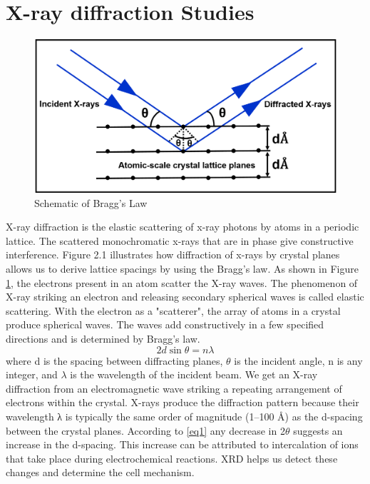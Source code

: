 \section{X-ray diffraction Studies}
\begin{figure}[tbh!]
\centering
\includegraphics[width=\textwidth]{Figures/XRD}
\caption{Schematic of Bragg's Law}
\label{Figures:XRD}
\end{figure}
X-ray diffraction is the elastic scattering of x-ray photons by atoms in a periodic lattice. The scattered monochromatic x-rays that are in phase give constructive interference. Figure 2.1 illustrates how diffraction of x-rays by crystal planes allows us to derive lattice spacings by using the Bragg's law. As shown in Figure \ref{Figures:XRD}, the electrons present in an atom scatter the X-ray waves. The phenomenon of X-ray striking an electron and releasing secondary spherical waves is called elastic scattering. With the electron as a "scatterer", the array of atoms in a crystal produce spherical waves. The waves add constructively in a few specified directions  and is determined by Bragg's law.
 \begin{equation} \label{eq1}
     2d\sin\theta = n\lambda
 \end{equation}
where d is the spacing between diffracting planes, $\theta$ is the incident angle, n is any integer, and $\lambda$ is the wavelength of the incident beam. We get an X-ray diffraction from an electromagnetic wave striking a repeating arrangement of electrons within the crystal. X-rays produce the diffraction pattern because their wavelength λ is typically the same order of magnitude (1–100 \AA ) as the d-spacing between the crystal planes. According to \ref{eq1} any decrease in 2$\theta$ suggests an increase in the d-spacing. This increase can be attributed to intercalation of ions that take place during electrochemical reactions. XRD helps us detect these changes and determine the cell mechanism.

